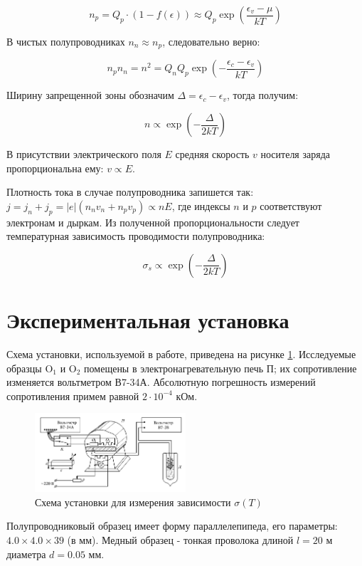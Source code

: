 \documentclass[12pt]{kiarticle} %
\begin{document}
	\[ n_p = Q_p \cdot (1 - f(\epsilon)) \approx Q_p \exp\left(\frac{\epsilon_v - \mu}{kT}\right) \]
	
	В чистых полупроводниках $n_n \approx n_p$, следовательно верно: 
	
	\[ n_pn_n = n^2 = Q_nQ_p\exp\left(-\frac{\epsilon_c - \epsilon_v}{kT}\right) \]
	
	Ширину запрещенной зоны обозначим $\Delta = \epsilon_c - \epsilon_v$, тогда получим: 
	
	\[ n \propto \exp\left(-\frac{\Delta}{2kT}\right) \]	
	
	В присутствии электрического поля $E$ средняя скорость $v$ носителя заряда пропорциональна ему: $v \propto E$. 
	
	Плотность тока в случае полупроводника запишется так: $j = j_n + j_p = |e|(n_nv_n + n_pv_p) \propto nE$, где индексы $n$ и $p$ соответствуют электронам и дыркам. Из полученной пропорциональности следует температурная зависимость проводимости полупроводника: 
	
	\[ \sigma_s \propto \exp\left(-\frac{\Delta}{2kT}\right) \]
	
	\section{Экспериментальная установка}
	
	Схема установки, используемой в работе, приведена на рисунке \ref{pic:scheme}. Исследуемые образцы O$_1$ и O$_2$ помещены в электронагревательную печь П; их сопротивление изменяется вольтметром В7-34А. Абсолютную погрешность измерений сопротивления примем равной $2\cdot10^{-4}$ кОм. 
	
	\begin{figure}[h]
		\centering	
		\includegraphics[width=0.5\textwidth]{scheme.png}
		\caption{Схема установки для измерения зависимости $\sigma(T)$}
		\label{pic:scheme}
	\end{figure} 
	
	Полупроводниковый образец имеет форму параллелепипеда, его параметры: $4.0 \times 4.0 \times 39$ (в мм). Медный образец - тонкая проволока длиной $l = 20$ м диаметра $d = 0.05$ мм.
	
\end{document}
